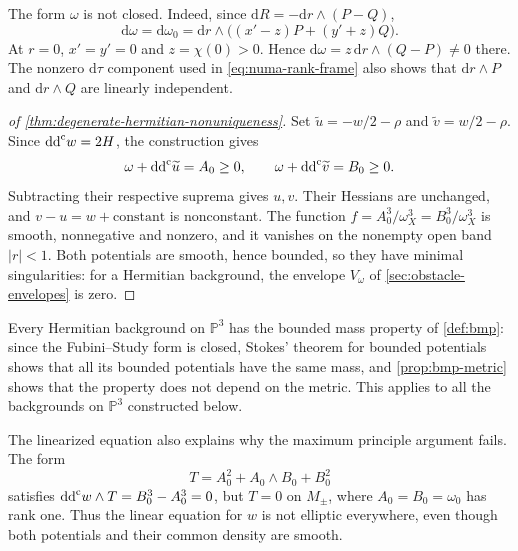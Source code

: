 The form $\omega$ is not closed. Indeed, since $\mathrm{d}R=-\mathrm{d}r\wedge(P-Q)$,
\begin{equation}\label{eq:numa-differential}
 \mathrm{d}\omega=\mathrm{d}\omega_0
   =\mathrm{d}r\wedge\bigl((x'-z)P+(y'+z)Q\bigr).
\end{equation}
At $r=0$, $x'=y'=0$ and $z=\chi(0)>0$. Hence $\mathrm{d}\omega=z\,\mathrm{d}r\wedge(Q-P)\ne0$ there. The nonzero $\mathrm{d}\tau$ component used in \eqref{eq:numa-rank-frame} also shows that $\mathrm{d}r\wedge P$ and $\mathrm{d}r\wedge Q$ are linearly independent.

\begin{proof}[of \cref{thm:degenerate-hermitian-nonuniqueness}]
Set $\widetilde u=-w/2-\rho$ and $\widetilde v=w/2-\rho$. Since $\mathrm{dd}^{\mathrm{c}} w=2H$, the construction gives
\[
 \omega+\mathrm{dd}^{\mathrm{c}}\widetilde u=A_0\geq0,\qquad
 \omega+\mathrm{dd}^{\mathrm{c}}\widetilde v=B_0\geq0.
\]
Subtracting their respective suprema gives $u,v$. Their Hessians are unchanged, and $v-u=w+\text{constant}$ is nonconstant. The function $f=A_0^3/\omega_X^3=B_0^3/\omega_X^3$ is smooth, nonnegative and nonzero, and it vanishes on the nonempty open band $|r|<1$. Both potentials are smooth, hence bounded, so they have minimal singularities: for a Hermitian background, the envelope $V_\omega$ of \cref{sec:obstacle-envelopes} is zero.
\end{proof}

Every Hermitian background on $\mathbb P^3$ has the bounded mass property of \cref{def:bmp}: since the Fubini--Study form is closed, Stokes' theorem for bounded potentials shows that all its bounded potentials have the same mass, and \cref{prop:bmp-metric} shows that the property does not depend on the metric. This applies to all the backgrounds on $\mathbb P^3$ constructed below.

The linearized equation also explains why the maximum principle argument fails. The form
\[
 T=A_0^2+A_0\wedge B_0+B_0^2
\]
satisfies $\mathrm{dd}^{\mathrm{c}} w\wedge T=B_0^3-A_0^3=0$, but $T=0$ on $M_\pm$, where $A_0=B_0=\omega_0$ has rank one. Thus the linear equation for $w$ is not elliptic everywhere, even though both potentials and their common density are smooth.
